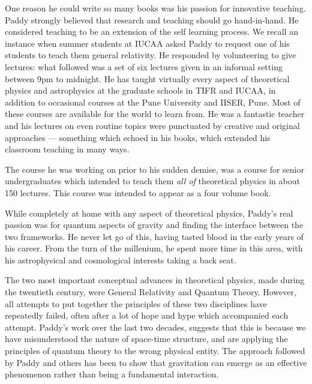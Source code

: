 \documentclass[prd, preprint, longbibliography, 11pt]{revtex4-1}
\begin{document}
One reason he could write so many books was his passion for innovative
teaching. Paddy strongly believed that research and teaching should go
hand-in-hand.
He considered teaching to be an extension of the self learning process.
We recall an instance when summer students at IUCAA asked Paddy to
request one of his students to teach them general relativity.
He responded by volunteering to give lectures: what followed was a set
of six lectures given in an informal setting between 9pm to midnight. 
He has taught virtually every aspect of theoretical physics and
astrophysics at the graduate schools in TIFR and IUCAA, in addition to
occasional courses at the Pune University and IISER, Pune.
Most of these courses are available for the world to learn from.
He was a fantastic teacher and his lectures on even routine topics
were punctuated by  creative and original approaches --- something
which echoed in his books, which extended  his classroom teaching in
many ways. 

The course he was working on  prior to his sudden demise, was a course
for senior undergraduates which intended to  teach them \textit{all
  of} theoretical physics in about 150 lectures. This course was
intended to appear as a four volume book.  

While completely at home with any aspect of theoretical physics,
Paddy's real passion was for quantum aspects of gravity and finding
the interface between the two frameworks.
He never let go of this, having tasted blood in the early years of his
career.
From the turn of the millenium, he spent more time in this area, with
his astrophysical and cosmological interests taking a back seat.  

The two most important conceptual advances in theoretical physics,
made during the twentieth century, were General Relativity and Quantum
Theory.
However, all attempts to put together the principles of these two
disciplines have repeatedly failed, often after a lot of hope and hype
which accompanied  each attempt.
Paddy's work over the last two decades, suggests that this is because
we have misunderstood the nature of space-time structure, and are
applying the principles of quantum theory to the wrong physical
entity.
The approach followed by Paddy and others has been to show that
gravitation can emerge as an effective phenomenon rather than being a
fundamental interaction. 
\end{document}
